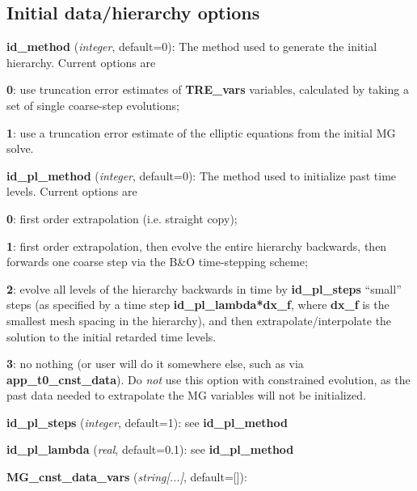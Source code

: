 \documentclass[aps,amssymb,unsortedaddress,nofootinbib]{revtex4}
\def\lsep{\itemsep 0.05in}
\begin{document}
\subsection{Initial data/hierarchy options}

\begin{list}{}{\lsep}
\item {\bf id\_method} ({\em integer}, default=0):
      The method used to generate the initial hierarchy. Current options
      are 
      \begin{list}{}{\lsep}
      \item {\bf 0}: use truncation error estimates of {\bf TRE\_vars} variables,
            calculated by taking a set of single coarse-step evolutions;
      \item {\bf 1}: use a truncation error estimate of the elliptic
            equations from the initial MG solve.
      \end{list}
\item {\bf id\_pl\_method} ({\em integer}, default=0):
      The method used to initialize past time levels. Current options
      are 
      \begin{list}{}{\lsep}
      \item {\bf 0}: first order extrapolation (i.e. straight copy);
      \item {\bf 1}: first order extrapolation, then evolve the entire hierarchy
            backwards, then forwards one coarse step via the B\&O time-stepping
            scheme;
      \item {\bf 2}: evolve all levels of the hierarchy backwards in time 
             by {\bf id\_pl\_steps} ``small'' steps (as specified by a time step
            {\bf id\_pl\_lambda*dx\_f}, where {\bf dx\_f} is the smallest mesh spacing
            in the hierarchy), and then extrapolate/interpolate the solution to the initial
            retarded time levels.
      \item {\bf 3}: no nothing (or user will do it somewhere else, such
            as via {\bf app\_t0\_cnst\_data}).
            Do {\em not} use this option with constrained evolution, as the past
            data needed to extrapolate the MG variables will not be initialized.
      \end{list}
\item {\bf id\_pl\_steps} ({\em integer}, default=1): see {\bf id\_pl\_method}
\item {\bf id\_pl\_lambda} ({\em real}, default=0.1): see {\bf id\_pl\_method}
\item {\bf MG\_cnst\_data\_vars} ({\em string[...]}, default=[]):

\end{list}
\end{document}
